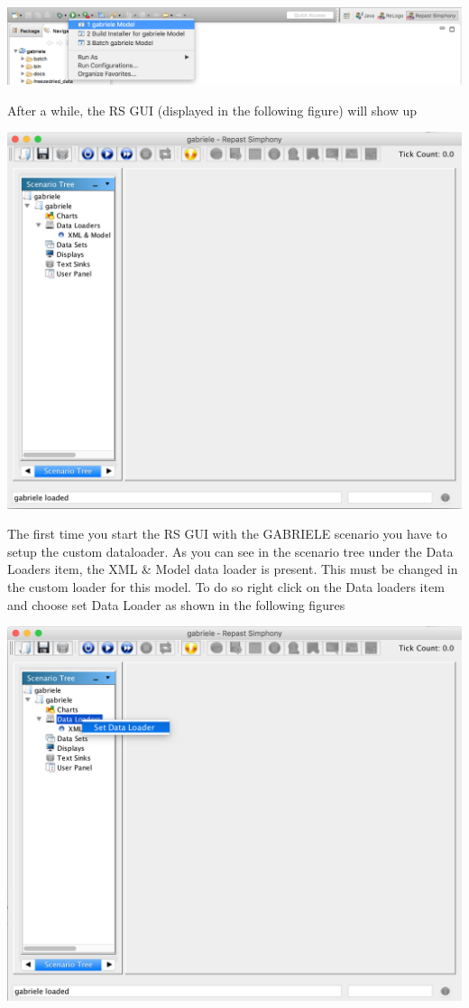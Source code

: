\documentclass{book}
\begin{document}
\noindent
\includegraphics[scale=0.35]{fig_gabriele_rs_execution2}

After a while, the RS GUI (displayed in the following figure) will show up

\noindent
\includegraphics[scale=0.35]{fig_gabriele_rs_gui1}

The first time you start the RS GUI with the GABRIELE scenario you have to setup the custom dataloader. As you can see in the scenario tree under the Data Loaders item, the XML \& Model data loader is present. This must be changed in the custom loader for this model. To do so right click on the Data loaders item and choose set Data Loader as shown in the following figures


\noindent
\includegraphics[scale=0.35]{fig_gabriele_rs_gui2}
\end{document}

